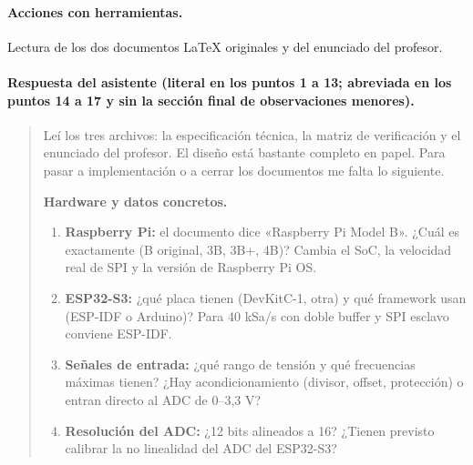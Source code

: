 \documentclass[12pt,a4paper]{article}
\begin{document}
\paragraph{Acciones con herramientas.} Lectura de los dos documentos \LaTeX{} originales y del enunciado del profesor.

\paragraph{Respuesta del asistente (literal en los puntos 1 a 13; abreviada en los puntos 14 a 17 y sin la sección final de observaciones menores).}
\begin{quote}\small
Leí los tres archivos: la especificación técnica, la matriz de verificación y el enunciado del profesor. El diseño está bastante completo en papel. Para pasar a implementación o a cerrar los documentos me falta lo siguiente.

\textbf{Hardware y datos concretos.}
\begin{enumerate}[leftmargin=*]
\item \textbf{Raspberry Pi:} el documento dice «Raspberry Pi Model B». ¿Cuál es exactamente (B original, 3B, 3B+, 4B)? Cambia el SoC, la velocidad real de SPI y la versión de Raspberry Pi OS.
\item \textbf{ESP32-S3:} ¿qué placa tienen (DevKitC-1, otra) y qué framework usan (ESP-IDF o Arduino)? Para 40 kSa/s con doble buffer y SPI esclavo conviene ESP-IDF.
\item \textbf{Señales de entrada:} ¿qué rango de tensión y qué frecuencias máximas tienen? ¿Hay acondicionamiento (divisor, offset, protección) o entran directo al ADC de 0--3,3 V?
\item \textbf{Resolución del ADC:} ¿12 bits alineados a 16? ¿Tienen previsto calibrar la no linealidad del ADC del ESP32-S3?
\end{enumerate}


\end{quote}
\end{document}
